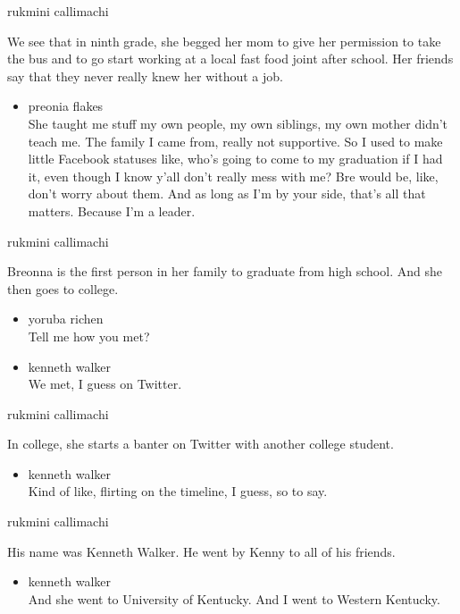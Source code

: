 rukmini callimachi

We see that in ninth grade, she begged her mom to give her permission to
take the bus and to go start working at a local fast food joint after
school. Her friends say that they never really knew her without a job.

\begin{itemize}
\tightlist
\item
  preonia flakes\\
  She taught me stuff my own people, my own siblings, my own mother
  didn't teach me. The family I came from, really not supportive. So I
  used to make little Facebook statuses like, who's going to come to my
  graduation if I had it, even though I know y'all don't really mess
  with me? Bre would be, like, don't worry about them. And as long as
  I'm by your side, that's all that matters. Because I'm a leader.
\end{itemize}

rukmini callimachi

Breonna is the first person in her family to graduate from high school.
And she then goes to college.

\begin{itemize}
\item
  yoruba richen\\
  Tell me how you met?
\item
  kenneth walker\\
  We met, I guess on Twitter.
\end{itemize}

rukmini callimachi

In college, she starts a banter on Twitter with another college student.

\begin{itemize}
\tightlist
\item
  kenneth walker\\
  Kind of like, flirting on the timeline, I guess, so to say.
\end{itemize}

rukmini callimachi

His name was Kenneth Walker. He went by Kenny to all of his friends.

\begin{itemize}
\tightlist
\item
  kenneth walker\\
  And she went to University of Kentucky. And I went to Western
  Kentucky.
\end{itemize}

